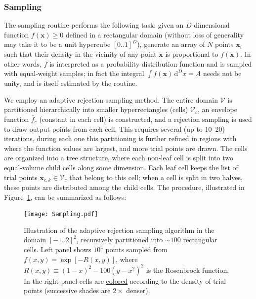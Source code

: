 \documentclass[12pt]{article}
\renewcommand{\d}{\mathrm{d}}
\newcommand{\bx}{\boldsymbol{x}}
\begin{document}
\subsubsection{Sampling}  \label{sec:MathSamplingDetails}

The sampling routine performs the following task: given an $D$-dimensional function $f(\bx)\ge 0$ defined in a rectangular domain (without loss of generality may take it to be a unit hypercube $[0..1]^D$), generate an array of $N$ points $\bx_i$ such that their density in the vicinity of any point $\bx$ is proportional to $f(\bx)$. In other words, $f$ is interpreted as a probability distribution function and is sampled with equal-weight samples; in fact the integral $\int f(\bx)\, \d ^D x = A$ needs not be unity, and is itself estimated by the routine.

We employ an adaptive rejection sampling method.
The entire domain $\mathcal{V}$ is partitioned hierarchically into smaller hyperrectangles (cells) $\mathcal{V}_c$, an envelope function $\bar f_c$ (constant in each cell) is constructed, and a rejection sampling is used to draw output points from each cell. This requires several (up to 10--20) iterations, during each one this partitioning is further refined in regions with where the function values are largest, and more trial points are drawn. The cells are organized into a tree structure, where each non-leaf cell is split into two equal-volume child cells along some dimension. Each leaf cell keeps the list of trial points $\bx_{c,k}\in\mathcal{V}_c$ that belong to this cell; when a cell is split in two halves, these points are distributed among the child cells.
The procedure, illustrated in Figure~\ref{fig:Sampling}, can be summarized as follows:

\begin{figure}
\begin{center}
\texttt{[image: Sampling.pdf]}
\end{center}
\caption{Illustration of the adaptive rejection sampling algorithm in the domain $[-1..2]^2$, recursively partitioned into $\sim 100$ rectangular cells. Left panel shows $10^4$ points sampled from $f(x,y) = \exp[-R(x,y)]$, where $R(x,y) \equiv (1-x)^2-100(y-x^2)^2$ is the Rosenbrock function. In the right panel cells are \href{https://www.google.com/search?q=mondrian&tbm=isch}{colored} according to the density of trial points (successive shades are $2\times$ denser).
} \label{fig:Sampling}
\end{figure}
\end{document}
